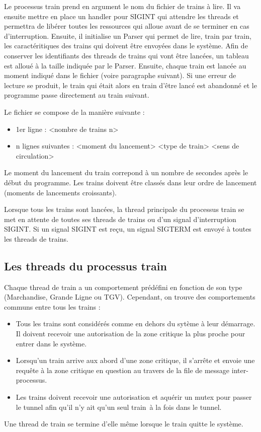 \documentclass[a4paper,12pt]{article}
\begin{document}
Le processus train prend en argument le nom du fichier de trains à lire. Il va ensuite mettre en place un handler pour SIGINT qui attendre les threads et permettra de libérer toutes les ressources qui alloue avant de se terminer en cas d'interruption. Ensuite, il initialise un Parser qui permet de lire, train par train, les caractéritiques des trains qui doivent être envoyées dans le système. Afin de conserver les identifiants des threads de trains qui vont être lancées, un tableau est alloué à la taille indiquée par le Parser. Ensuite, chaque train est lancée au moment indiqué dans le fichier (voire paragraphe suivant). Si une erreur de lecture se produit, le train qui était alors en train d'être lancé est abandonné et le programme passe directement au train suivant.

Le fichier se compose de la manière suivante :

\begin{itemize}
	\item 1er ligne : <nombre de trains n>
	\item n lignes suivantes : <moment du lancement> <type de train> <sens de circulation>
\end{itemize}

Le moment du lancement du train correpond à un nombre de secondes après le début du programme. Les trains doivent être classés dans leur ordre de lancement (moments de lancements croissants).

Lorsque tous les trains sont lancées, la thread principale du processus train se met en attente de toutes ses threads de trains ou d'un signal d'interruption SIGINT. Si un signal SIGINT est reçu, un signal SIGTERM est envoyé à toutes les threads de trains.

\subsection{Les threads du processus train}

Chaque thread de train a un comportement prédéfini en fonction de son type (Marchandise, Grande Ligne ou TGV). Cependant, on trouve des comportements communs entre tous les trains :
\begin{itemize}
	\item Tous les trains sont considérés comme en dehors du sytème à leur démarrage. Il doivent recevoir une autorisation de la zone critique la plus proche pour entrer dans le système.
	\item Lorsqu'un train arrive aux abord d'une zone critique, il s'arrête et envoie une requête à la zone critique en question au travers de la file de message inter-processus.
	\item Les trains doivent recevoir une autorisation et aquérir un mutex pour passer le tunnel afin qu'il n'y ait qu'un seul train à la fois dans le tunnel.
\end{itemize}
Une thread de train se termine d'elle même lorsque le train quitte le système.
\end{document}
